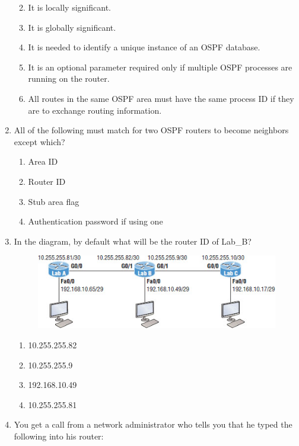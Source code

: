 \begin{enumerate}
  \begin{enumerate}
  \def\labelenumii{\Alph{enumii}.}
    \item
    It is locally significant.
  \item
    It is globally significant.
  \item
    It is needed to identify a unique instance of an OSPF database.
  \item
    It is an optional parameter required only if multiple OSPF processes
    are running on the router.
  \item
    All routes in the same OSPF area must have the same process ID if
    they are to exchange routing information.
  \end{enumerate}
\item
  All of the following must match for two OSPF routers to become
  neighbors except which?

  \begin{enumerate}
  \def\labelenumii{\Alph{enumii}.}
    \item
    Area ID
  \item
    Router ID
  \item
    Stub area flag
  \item
    Authentication password if using one
  \end{enumerate}
\item
  In the diagram, by default what will be the router ID of Lab\_B?

  \begin{figure}
  \centering
      \includegraphics{images/c18f009.jpg}
  \caption{}
  \end{figure}

  \begin{enumerate}
  \def\labelenumii{\Alph{enumii}.}
    \item
    10.255.255.82
  \item
    10.255.255.9
  \item
    192.168.10.49
  \item
    10.255.255.81
  \end{enumerate}
\item
  You get a call from a network administrator who tells you that he
  typed the following into his router:


\end{enumerate}
